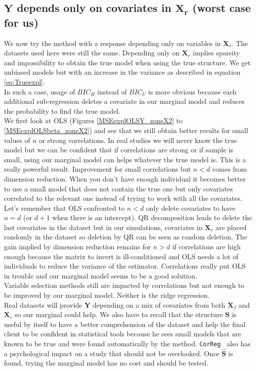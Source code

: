 \documentclass[12pt,a4paper]{report}
\begin{document}
\clearpage
	
	\subsection{$\boldsymbol{Y}$ depends only on covariates in $\boldsymbol{X_r}$ (worst case for us)}	 \label{tableMSEsimgauche}
We now try the method with a response depending only on variables in $\boldsymbol{X}_{r}$. The datasets used here were still the same.
Depending only on $\boldsymbol{X}_r$ implies sparsity and impossibility to obtain the true model when using the true structure.  We get unbiased models but with an increase in the variance as described in equation \ref{eq:Trueexpl}. \\
	In such a case, usage of $BIC_H$ instead of $BIC_U$ is more obvious because each additional sub-regression deletes a covariate in our marginal model and reduces the probability to find the true model. \\
	
	We first look at OLS (Figures \ref{MSEexplOLSY_zoneX2} to \ref{MSEexplOLSbeta_zoneX2}) and see that we still obtain better results for small values of $n$ or strong correlations. In real studies we will never know the true model but we can be confident that if correlations are strong or if sample is small, using our marginal model can helps whatever the true model is. This is a really powerful result. Improvement for small correlations but $n<d$ comes from dimension reduction. When you don't have enough individual it becomes better to use a small model that does not contain the true one but only covariates correlated to the relevant one instead of trying to work with all the covariates. Let's remember that OLS confronted to $n<d$ only delete covariates to have $n=d$ (or $d+1$ when there is an intercept). QR decomposition leads to delete the last  covariates in the dataset but in our simulations, covariates in $\boldsymbol{X}_r$ are placed randomly in the dataset so deletion by QR can be seen as random deletion. The gain implied by dimension reduction remains for $n>d$ if correlations are high enough because the matrix to invert is ill-conditioned and OLS needs a lot of individuals to reduce the variance of the estimator. Correlations really put OLS in trouble and our marginal model seems to be a good solution. \\
	
	Variable selection methods still are impacted by correlations but not enough to be improved by our marginal model. Neither is the ridge regression.\\
	 Real datasets will provide $\boldsymbol{Y}$ depending on a mix of covariates from both $\boldsymbol{X}_f$ and $\boldsymbol{X}_r$ so our marginal could help. We also have to recall that the structure $\boldsymbol{S}$ is useful by itself to have a better comprehension of the dataset and help the final client to be confident in statistical tools because he sees small models that are known to be true and were found automatically by the method. {\tt CorReg } also has a psychological impact on a study that should not be overlooked. Once $\hat{\boldsymbol{S}}$ is found, trying the marginal model has no cost and should be tested.
\end{document}
